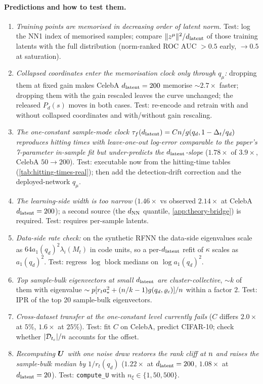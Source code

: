 \paragraph{Predictions and how to test them.}
\begin{enumerate}
\item \emph{Training points are memorised in decreasing order of latent norm.} Test: log the NN1 index of memorised samples; compare $\|z^\mu\|^2/d_{\mathrm{latent}}$ of those training latents with the full distribution (norm-ranked ROC AUC $>0.5$ early, $\to0.5$ at saturation).
\item \emph{Collapsed coordinates enter the memorisation clock only through $q_\mu$:} dropping them at fixed gain makes CelebA $d_{\mathrm{latent}}=200$ memorise $\sim2.7\times$ faster; dropping them with the gain rescaled leaves the curve unchanged; the released $P_d(s)$ moves in both cases. Test: re-encode and retrain with and without collapsed coordinates and with/without gain rescaling.
\item \emph{The one-constant sample-mode clock $\tau_f(d_{\mathrm{latent}})=Cn/g(q_d,1-\Delta_t/q_d)$ reproduces hitting times with leave-one-out log-error comparable to the paper's 7-parameter in-sample fit but under-predicts the $d_{\mathrm{latent}}$-slope} ($1.78\times$ of $3.9\times$, CelebA $50\to200$). Test: executable now from the hitting-time tables (\cref{tab:hitting-times-real}); then add the detection-drift correction and the deployed-network $q_\mu$.
\item \emph{The learning-side width is too narrow} ($1.46\times$ vs observed $2.14\times$ at CelebA $d_{\mathrm{latent}}=200$); a second source (the $d_{\rm NN}$ quantile, \cref{app:theory-bridge}) is required. Test: requires per-sample latents.
\item \emph{Data-side rate check:} on the synthetic RFNN the data-side eigenvalues scale as $64a_1(q_d)^2\lambda_i(M_t)$ in code units, so a per-$d_{\mathrm{latent}}$ refit of $\kappa$ scales as $a_1(q_d)^2$. Test: regress $\log$ block medians on $\log a_1(q_d)^2$.
\item \emph{Top sample-bulk eigenvectors at small $d_{\mathrm{latent}}$ are cluster-collective}, $\sim k$ of them with eigenvalue $\sim p[r_ta_*^2+(n/k-1)g(q_d,\varrho_c)]/n$ within a factor $2$. Test: IPR of the top 20 sample-bulk eigenvectors.
\item \emph{Cross-dataset transfer at the one-constant level currently fails} ($C$ differs $2.0\times$ at $5\%$, $1.6\times$ at $25\%$). Test: fit $C$ on CelebA, predict CIFAR-10; check whether $|\mathcal D_{t_c}|/n$ accounts for the offset.
\item \emph{Recomputing $\bm{U}$ with one noise draw restores the rank cliff at $n$ and raises the sample-bulk median by $1/r_t(q_d)$} ($1.22\times$ at $d_{\mathrm{latent}}=200$, $1.08\times$ at $d_{\mathrm{latent}}=20$). Test: \texttt{compute\_U} with $n_\xi\in\{1,50,500\}$.
\end{enumerate}


